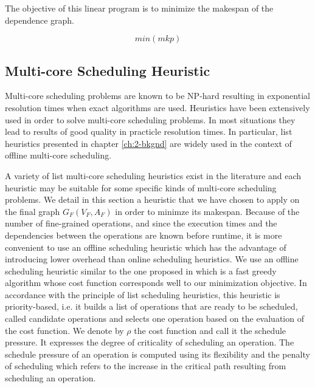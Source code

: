 The objective of this linear program is to minimize the makespan of the dependence graph.

\begin{equation}
min(mkp)
\label{sched:obj}
\end{equation}


\subsection{Multi-core Scheduling Heuristic}

Multi-core scheduling problems are known to be NP-hard resulting in exponential resolution times when exact algorithms are used. Heuristics have been extensively used in order to solve multi-core scheduling problems. In most situations they lead to results of good quality in practicle resolution times. In particular, list heuristics presented in chapter \ref{ch:2-bkgnd} are widely used in the context of offline multi-core scheduling.

A variety of list multi-core scheduling heuristics exist in the literature and each heuristic may be suitable for some specific kinds of multi-core scheduling problems. We detail in this section a heuristic that we have chosen to apply on the final graph $G_F(V_F,A_F)$ in order to minimze its makespan. Because of the number of fine-grained operations, and since the execution times and the dependencies between the operations are known before runtime, it is more convenient to use an offline scheduling heuristic which has the advantage of introducing lower overhead than online scheduling heuristics. We use an offline scheduling heuristic similar to the one proposed in \cite{grandpierre:1999} which is a fast greedy algorithm whose cost function corresponds well to our minimization objective. In accordance with the principle of list scheduling heuristics, this heuristic is priority-based, i.e. it builds a list of operations that are ready to be scheduled, called candidate operations and selects one operation based on the evaluation of the cost function. We denote by $\rho$ the cost function and call it the schedule pressure. It expresses the degree of criticality of scheduling an operation. The schedule pressure of an operation is computed using its flexibility and the penalty of scheduling which refers to the increase in the critical path resulting from scheduling an operation.  

